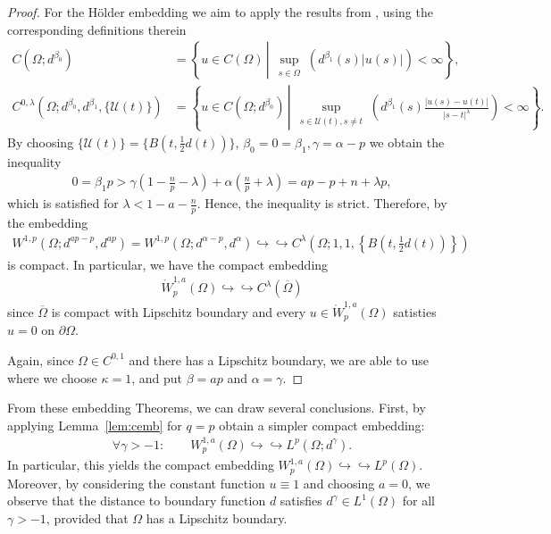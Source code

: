 \documentclass[12pt,a4paper,twoside]{article}
\newcommand {\cb}[1] {\tikz[baseline=(char.base)]{
            \node[shape=circle,draw,inner sep=2pt] (char) {\itshape{\textbf{#1}}};}}
\newcommand {\cbm}[1] {\tikz[baseline=(char.base)]{
            \node[shape=circle,draw,inner sep=2pt] (char) {\scriptsize\itshape{\textbf{#1}}};}}
\begin{document}
\begin{proof}
For the Hölder embedding we aim to apply the results from \cite[p. 292 (5.8)-(5.9)]{brown1992embeddings}, using the corresponding definitions therein
\begin{align*}
     C(\Omega; d^{\beta_0})
    &= \left\{ u\in C(\Omega) \, 
    \left| \, 
    \sup_{\substack{s\in\Omega}} \left( d^{\beta_1}(s)|u(s)|\right)<\infty \right\} \right.,\\
    C^{0,\lambda}(\Omega; d^{\beta_0},d^{\beta_1},\{\mathcal{U}(t)\})
    &= \left\{ u\in C(\Omega; d^{\beta_0}) \, 
    \left| \, 
    \sup_{\substack{s\in \mathcal{U}(t), s\not=t}} \left( d^{\beta_1}(s)\frac{|u(s)-u(t)|}{|s-t|^\lambda}\right)<\infty \right\} \right. .
\end{align*}
By choosing $\{\mathcal{U}(t) \}=\{B(t,\frac{1}{2}d(t))\}$, $\beta_0=0=\beta_1, \gamma=\alpha-p$ we obtain
the inequality \begin{align*}
 0=   \beta_1 p  > \gamma \left(1-\frac{n}{p}-\lambda\right) + \alpha \left(\frac{n}{p}+\lambda\right)
 = ap -p+n +\lambda p,
\end{align*}
which is satisfied for $\lambda<1-a-\frac{n}{p}$. Hence, the inequality \cite[p. 292 (5.8) ]{brown1992embeddings} is strict. Therefore, by \cite[p. 292 (5.9) and p.295 Remark 5.2]{brown1992embeddings} the embedding 
\begin{align*}
    W^{1,p}(\Omega;d^{ap-p},d^{ap})=
    W^{1,p}(\Omega; d^{\alpha-p}, d^{\alpha}) \hookrightarrow\hookrightarrow C^\lambda\left(\Omega;1,1,\left\{ B\left(t,\textstyle\frac{1}{2}d(t)\right)\right\}\right) 
\end{align*}
is compact. In particular, we have the compact embedding
\begin{align*}
    \mathring{W}^{1,a}_p(\Omega) \hookrightarrow\hookrightarrow  C^\lambda(\overline{\Omega})
\end{align*}
since $\overline{\Omega}$ is compact with Lipschitz boundary and every $u \in \mathring{W}^{1,a}_p(\Omega) $ satisties $u=0$ on $\partial\Omega$.

\noindent \cb d
Again, since $\Omega\in C^{0,1}$ and there has a Lipschitz boundary, we are able to use \cite[p.275 Theorem 19.11 (19.39)]{opic1990hardy} where we choose $\kappa =1$, and put $\beta = ap$ and $\alpha=\gamma$. 
\end{proof}


From these embedding Theorems, we can draw several conclusions. First,  by applying Lemma~\ref{lem:cemb} \cbm d for $q=p$ obtain a simpler compact embedding:
\begin{align}
    \forall \gamma>-1: \qquad W^{1,a}_p(\Omega)  \hookrightarrow\hookrightarrow L^p(\Omega; d^{\gamma}). \label{eq:embpq}
\end{align}
In particular, this yields the compact embedding $W^{1,a}_p(\Omega)  \hookrightarrow\hookrightarrow L^p(\Omega)$. Moreover, by considering the constant function $u\equiv 1$ and choosing $a=0$, we observe that the distance to boundary function  $d$  satisfies $d^\gamma \in  L^1(\Omega)$ for all $\gamma>-1$, provided that $\Omega$ has a Lipschitz boundary. 
\end{document}
